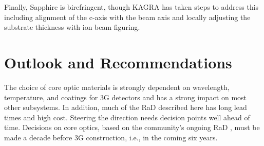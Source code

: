 Finally, Sapphire is birefringent, though \ac{KAGRA} has taken steps to address this including alignment of the c-axis with the beam axis and locally adjusting the substrate thickness with ion beam figuring.  





\section{Outlook and Recommendations} 
The choice of core optic materials is strongly dependent on wavelength, temperature, and coatings for \ac{3G}  detectors and has a strong impact on most other subsystems. In addition, much of the \ac{RaD}   described here has long lead times and high cost. Steering the direction needs decision points well ahead of time. Decisions on core optics, based on the community's ongoing \ac{RaD}  , must be made a decade before \ac{3G}  construction, i.e., in the coming six years. 

